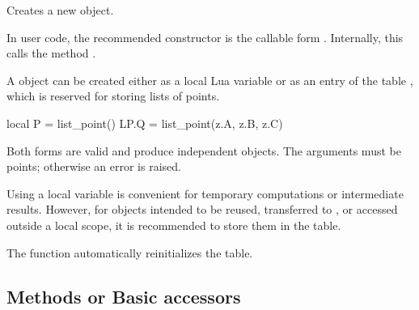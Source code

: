Creates a new  object.

In user code, the recommended constructor is the callable form .
Internally, this calls the method .

\medskip

A  object can be created either as a local Lua variable
or as an entry of the table , which is reserved for storing
lists of points.

\begin{tkzexample}
local P = list_point()
LP.Q = list_point(z.A, z.B, z.C)
\end{tkzexample}

Both forms are valid and produce independent  objects.
The arguments must be points; otherwise an error is raised.

\medskip

Using a local variable is convenient for temporary computations or intermediate results.
However, for objects intended to be reused, transferred to ,
or accessed outside a local scope, it is recommended to store them in the
 table.

\medskip

The function  automatically reinitializes
the  table.


\subsection{Methods or Basic accessors}
\label{subsec:list_point_accessors}

